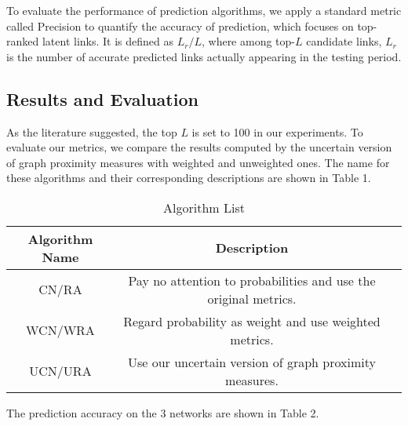 \documentclass[\main/thesis.tex]{subfiles}
\begin{document}
To evaluate the performance of prediction algorithms, we apply a standard metric called Precision to quantify the accuracy of prediction, which focuses on top-ranked latent links. It is defined as $L_r/L$, where among top-$L$ candidate links, $L_r$ is the number of accurate predicted links actually appearing in the testing period.


\subsection{Results and Evaluation}
As the literature  \cite{lu2010link,lu2011link,liu2011link,tan2014link,zhu2016link} suggested, the top $L$ is set to 100 in our experiments. To evaluate our metrics, we compare the results computed by the uncertain version of graph proximity measures with weighted and unweighted ones. The name for these algorithms and their corresponding descriptions are shown in Table 1.%

\begin{table}[]
\centering
\caption{Algorithm List}
\label{my-label}
\begin{tabular}{ccc}
\hline
Algorithm Name & Description                     \\ \hline
CN/RA      & Pay no attention to probabilities and use the original metrics.  \\
WCN/WRA       & Regard probability as weight and use weighted metrics.  \\
UCN/URA    & Use our uncertain version of graph proximity measures. \\ \hline
\end{tabular}
\end{table}

The prediction accuracy on the 3 networks are shown in Table 2.
\end{document}
